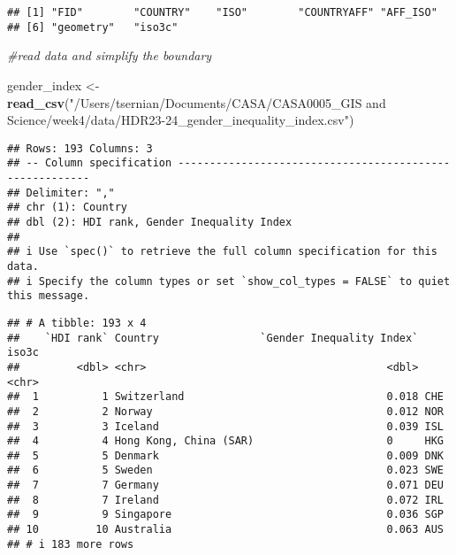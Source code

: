 \documentclass[
]{article}
\newenvironment{Shaded}{\begin{snugshade}}{\end{snugshade}}
\newcommand{\CommentTok}[1]{\textcolor[rgb]{0.56,0.35,0.01}{\textit{#1}}}
\newcommand{\FunctionTok}[1]{\textcolor[rgb]{0.13,0.29,0.53}{\textbf{#1}}}
\newcommand{\NormalTok}[1]{#1}
\newcommand{\OtherTok}[1]{\textcolor[rgb]{0.56,0.35,0.01}{#1}}
\newcommand{\SpecialCharTok}[1]{\textcolor[rgb]{0.81,0.36,0.00}{\textbf{#1}}}
\newcommand{\StringTok}[1]{\textcolor[rgb]{0.31,0.60,0.02}{#1}}
\begin{document}
\begin{verbatim}
## [1] "FID"        "COUNTRY"    "ISO"        "COUNTRYAFF" "AFF_ISO"   
## [6] "geometry"   "iso3c"
\end{verbatim}

\begin{Shaded}
\begin{Highlighting}[]
\CommentTok{\#read data and simplify the boundary }
\end{Highlighting}
\end{Shaded}

\begin{Shaded}
\begin{Highlighting}[]
\NormalTok{gender\_index }\OtherTok{\textless{}{-}} \FunctionTok{read\_csv}\NormalTok{(}\StringTok{"/Users/tsernian/Documents/CASA/CASA0005\_GIS and Science/week4/data/HDR23{-}24\_gender\_inequality\_index.csv"}\NormalTok{)}
\end{Highlighting}
\end{Shaded}

\begin{verbatim}
## Rows: 193 Columns: 3
## -- Column specification --------------------------------------------------------
## Delimiter: ","
## chr (1): Country
## dbl (2): HDI rank, Gender Inequality Index
## 
## i Use `spec()` to retrieve the full column specification for this data.
## i Specify the column types or set `show_col_types = FALSE` to quiet this message.
\end{verbatim}

\begin{Shaded}
\end{Shaded}

\begin{verbatim}
## # A tibble: 193 x 4
##    `HDI rank` Country                `Gender Inequality Index` iso3c
##         <dbl> <chr>                                      <dbl> <chr>
##  1          1 Switzerland                                0.018 CHE  
##  2          2 Norway                                     0.012 NOR  
##  3          3 Iceland                                    0.039 ISL  
##  4          4 Hong Kong, China (SAR)                     0     HKG  
##  5          5 Denmark                                    0.009 DNK  
##  6          5 Sweden                                     0.023 SWE  
##  7          7 Germany                                    0.071 DEU  
##  8          7 Ireland                                    0.072 IRL  
##  9          9 Singapore                                  0.036 SGP  
## 10         10 Australia                                  0.063 AUS  
## # i 183 more rows
\end{verbatim}
\end{document}
